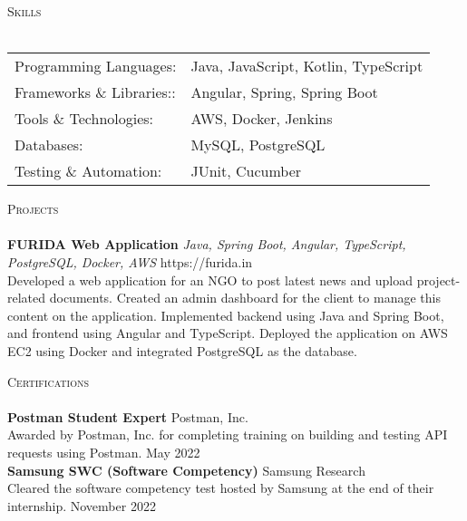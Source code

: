 \documentclass[a4paper]{article}
\newcommand{\lineunder} {
    \vspace*{-8pt} \\
    \hspace*{-18pt} \hrulefill \\
}
\newcommand{\header} [1] {
    {\hspace*{-18pt}\vspace*{6pt} \textsc{#1}}
    \vspace*{-6pt} \lineunder
}
\begin{document}
\header{Skills}
\begin{tabular}{ l l }
	Programming Languages:    & Java, JavaScript, Kotlin, TypeScript \\
	Frameworks \& Libraries:: & Angular, Spring, Spring Boot         \\
	Tools \& Technologies:    & AWS, Docker, Jenkins                 \\
	Databases:                & MySQL, PostgreSQL                    \\
	Testing \& Automation:    & JUnit, Cucumber                      \\
\end{tabular}
\vspace{2mm}

\header{Projects}
{\textbf{FURIDA Web Application}} {\sl Java, Spring Boot, Angular, TypeScript, PostgreSQL, Docker, AWS} \hfill https://furida.in\\
Developed a web application for an NGO to post latest news and upload project-related documents. Created an admin dashboard for the client to manage this content on the application. Implemented backend using Java and Spring Boot, and frontend using Angular and TypeScript. Deployed the application on AWS EC2 using Docker and integrated PostgreSQL as the database.\\
\vspace*{2mm}

\header{Certifications}
\textbf{Postman Student Expert} \hfill Postman, Inc.\\
Awarded by Postman, Inc. for completing training on building and testing API requests using Postman. \hfill May 2022\\
\vspace*{2mm}
\textbf{Samsung SWC (Software Competency)} \hfill Samsung Research\\
Cleared the software competency test hosted by Samsung at the end of their internship. \hfill November 2022\\
\vspace*{2mm}

\ 
\end{document}
